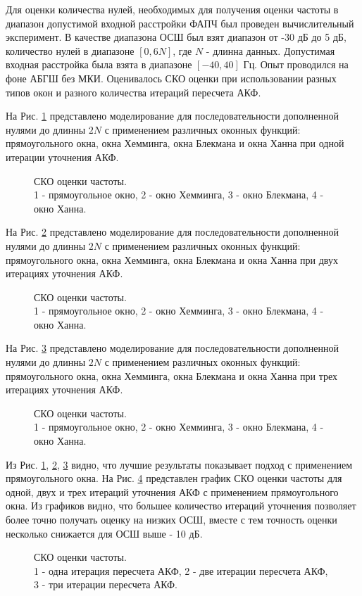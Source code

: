 Для оценки количества нулей, необходимых для получения оценки частоты в диапазон допустимой входной расстройки ФАПЧ был проведен вычислительный эксперимент. В качестве диапазона
ОСШ был взят диапазон от -30 дБ до 5 дБ, количество нулей в диапазоне ${[0, 6N]}$, где ${N}$ - длинна данных. Допустимая входная расстройка была взята в диапазоне ${[-40, 40]}$ Гц.
Опыт проводился на фоне АБГШ без МКИ. Оценивалось СКО оценки при использовании разных типов окон и разного количества итераций пересчета АКФ.

На Рис. \ref{pic:fft2_1} представлено моделирование для последовательности дополненной нулями до длинны ${2N}$ с применением различных оконных функций:
прямоугольного окна, окна Хемминга, окна Блекмана и окна Ханна при одной итерации уточнения АКФ.
\begin{figure}[h]
	\center{}
	\caption{СКО оценки частоты.\\1 - прямоугольное окно, 2 - окно Хемминга, 3 - окно Блекмана, 4 - окно Ханна.}
	\label{pic:fft2_1}
\end{figure}

На Рис. \ref{pic:fft2_2} представлено моделирование для последовательности дополненной нулями до длинны ${2N}$ с применением различных оконных функций:
прямоугольного окна, окна Хемминга, окна Блекмана и окна Ханна при двух итерациях уточнения АКФ.
\begin{figure}[h]
	\center{}
	\caption{СКО оценки частоты.\\1 - прямоугольное окно, 2 - окно Хемминга, 3 - окно Блекмана, 4 - окно Ханна.}
	\label{pic:fft2_2}
\end{figure}

На Рис. \ref{pic:fft2_3} представлено моделирование для последовательности дополненной нулями до длинны ${2N}$ с применением различных оконных функций:
прямоугольного окна, окна Хемминга, окна Блекмана и окна Ханна при трех итерациях уточнения АКФ.
\begin{figure}[h]
	\center{}
	\caption{СКО оценки частоты.\\1 - прямоугольное окно, 2 - окно Хемминга, 3 - окно Блекмана, 4 - окно Ханна.}
	\label{pic:fft2_3}
\end{figure}

Из Рис. \ref{pic:fft2_1}, \ref{pic:fft2_2}, \ref{pic:fft2_3} видно, что лучшие результаты показывает подход с применением прямоугольного окна. На Рис. \ref{pic:fft2_rect_1_2_3}
представлен график СКО оценки частоты для одной, двух и трех итераций уточнения АКФ с применением прямоугольного окна. Из графиков видно, что большее
количество итераций уточнения позволяет более точно получать оценку на низких ОСШ, вместе с тем точность оценки несколько снижается для ОСШ выше - 10 дБ.
\begin{figure}[h]
	\center{}
	\caption{СКО оценки частоты.\\1 - одна итерация пересчета АКФ, 2 - две итерации пересчета АКФ, 3 - три итерации пересчета АКФ.}
	\label{pic:fft2_rect_1_2_3}
\end{figure}

